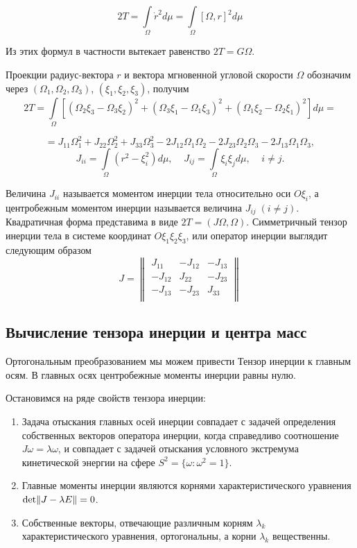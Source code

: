 \documentclass[a4paper,12pt, titlepage]{article}
\begin{document}
$$2T = \int \limits_{\Omega} \dot{r}^{2} d\mu = \int \limits_{\Omega} [\Omega,r]^{2}d\mu$$  

Из этих формул в частности вытекает равенство $2T = G\Omega$. 

Проекции радиус-вектора $r$ и  вектора мгновенной угловой скорости 
$\Omega$ обозначим через $({\Omega}_{1},{\Omega}_{2},{\Omega}_{3})$, $({\xi}_{1},{\xi}_{2},{\xi}_{3})$, 
получим 
$$2T = \int \limits_{\Omega}\left[ (   \Omega_{2}\xi_{3} - \Omega_{3}\xi_{2})^{2} 
									+ (\Omega_{3}\xi_{1} - \Omega_{1}\xi_{3})^{2} 
									+ (\Omega_{1}\xi_{2} - \Omega_{2}\xi_{1})^{2} \right]d\mu = $$
									
$$
 = {J}_{11}{\Omega}_{1}^{2} + {J}_{22}{\Omega}_{2}^{2} +{J}_{33}{\Omega}_{3}^{2}
 - 2{J}_{12}{\Omega}_{1}{\Omega}_{2} - 2{J}_{23}{\Omega}_{2}{\Omega}_{3} - 2{J}_{13}{\Omega}_{1}{\Omega}_{3},
$$
$$
{J}_{ii} = \int \limits_{\Omega} ({r}^{2} - {\xi}_{i}^{2})d\mu,\;\;\;\;{J}_{ij}  = \int \limits_{\Omega}\xi_{i}\xi_{j}d\mu,
\;\;\;\; i \neq j. 
$$

Величина ${J}_{ii}$ называется моментом инерции тела относительно оси $O\xi_{i}$, а центробежным моментом инерции называется
величина ${J}_{ij}\;(i \neq j)$. Квадратичная форма представима в виде $2T =  (J\Omega,\Omega)$.
Симметричный тензор инерции тела в системе координат $O\xi_{1}\xi_{2}\xi_{3}$, или оператор инерции выглядит следующим образом
\[
J = 
\begin{Vmatrix}
{J}_{11} & -{J}_{12} & -{J}_{13}\\
-{J}_{12} & {J}_{22} & -{J}_{23}\\
-{J}_{13} & -{J}_{23} & {J}_{33}\\
\end{Vmatrix}
\]
\newpage
\subsection{Вычисление тензора инерции и центра масс}
Ортогональным преобразованием мы можем привести Тензор инерции к главным осям. В главных осях центробежные моменты
инерции равны нулю.

Остановимся на ряде свойств тензора инерции:
\begin{enumerate}
\item Задача отыскания главных осей инерции совпадает с задачей определения собственных векторов оператора инерции, 
когда справедливо соотношение $J\omega = \lambda\omega$, и совпадает с задачей отыскания условного экстремума 
кинетической энергии на сфере ${S}^{2} = \{\omega:\omega^{2}  = 1\}$.
\item Главные моменты инерции являются корнями характеристического уравнения ${\rm det}\|J - \lambda E\| = 0$.
\item Собственные векторы, отвечающие различным корням $\lambda_{k}$ характеристического уравнения, ортогональны, а  
корни $\lambda_{k}$ вещественны. 
\end{enumerate}
\end{document}
